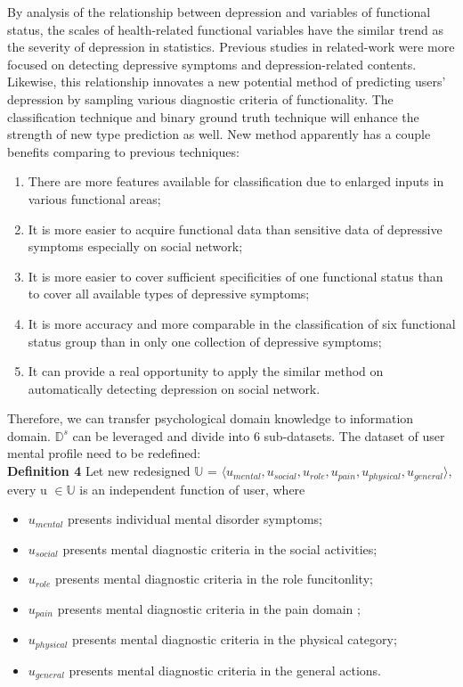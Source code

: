 \documentclass[10pt,journal,compsoc]{IEEEtran}
\begin{document}
By analysis of the relationship between depression and variables of functional status, the scales of health-related functional variables have the similar trend as the severity of depression in statistics. Previous studies in related-work were more focused on detecting depressive symptoms and depression-related contents. Likewise, this relationship innovates a new potential method of predicting users' depression by sampling various diagnostic criteria of functionality. The classification technique and binary ground truth technique will enhance the strength of new type prediction as well. New method apparently has a couple benefits comparing to previous techniques:
\begin{enumerate}[label=\alph*)]
  \item There are more features available for classification due to enlarged inputs in various functional areas;
  \item It is more easier to acquire functional data than sensitive data of depressive symptoms especially on social network; 
  \item It is more easier to cover sufficient specificities of one functional status than to cover all available types of depressive symptoms;
  \item It is more accuracy and more comparable in the classification of six functional status group than in only one collection of depressive symptoms;
  \item It can provide a real opportunity to apply the similar method on automatically detecting depression on social network.
\end{enumerate}

Therefore, we can transfer psychological domain knowledge to information domain. \textit{$\mathbb{D}^s$} can be leveraged and divide into 6 sub-datasets. The dataset of user mental profile need to be redefined:\\
\textbf{Definition 4} Let new redesigned $\mathbb{U}$ = $\langle u_{mental}, u_{social}, u_{role}, u_{pain}, u_{physical}, u_{general} \rangle$, every u  $\in \mathbb{U}$ is an independent function of user, where
\begin{itemize}
  \item $u_{mental}$ presents individual mental disorder symptoms;
  \item $u_{social}$ presents mental diagnostic criteria in the social activities;
  \item $u_{role}$ presents mental diagnostic criteria in the role funcitonlity;
  \item $u_{pain}$ presents mental diagnostic criteria in the pain domain ;
  \item $u_{physical}$ presents mental diagnostic criteria in the physical category;
  \item $u_{general}$ presents mental diagnostic criteria in the general actions.
\end{itemize}
\end{document}

